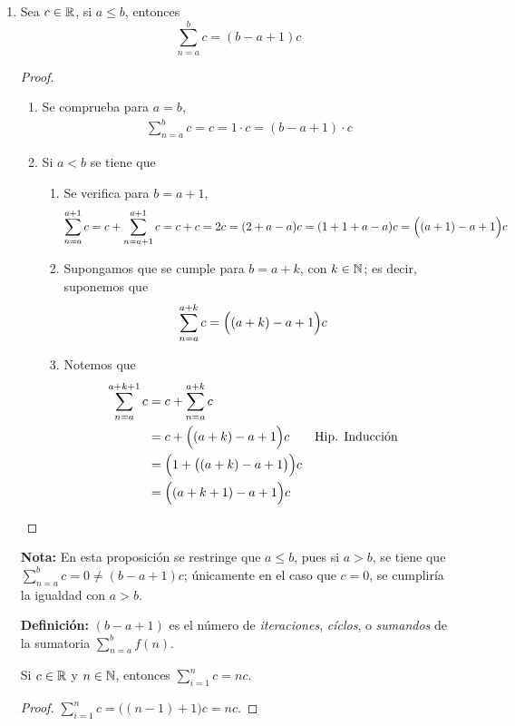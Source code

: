 \begin{enumerate}[label=\alph*)]
  \item Sea $c\in \mathbb{R}$, si $a\leq b$, entonces \[\sum_{n=a}^b c = (b-a+1)c\]
  \begin{proof}\leavevmode
    \begin{enumerate}[label=\Roman*)]
      \item Se comprueba para $a=b$, \begin{align*}
        \sum_{n=a}^b c = c = 1\cdot c = (b-a+1)\cdot c
      \end{align*}
      \item Si $a<b$ se tiene que \begin{enumerate}[label=\roman*)]
        \item Se verifica para $b=a+1$, \begin{align*}
          \sum_{n=a}^{a+1} c &= c + \sum_{n=a+1}^{a+1} c = c + c = 2c = (2+a-a)c = (1+1+a-a)c = \Bigl((a+1)-a+1\Bigr) c
        \end{align*}
        \item Supongamos que se cumple para $b=a+k$, con $k\in \mathbb{N}$; es decir, suponemos que \begin{align*}
          \sum_{n=a}^{a+k} c &= \Bigl((a+k)-a+1\Bigr) c
        \end{align*}
        \item Notemos que \begin{align*}
          \sum_{n=a}^{a+k+1} c &= c + \sum_{n=a}^{a+k} c\\
          &= c + \Bigl((a+k)-a+1\Bigr) c && \text{Hip. Inducción}\\
          &= \Bigl(1 + \bigl((a+k)-a+1\bigr) \Bigr)c\\
          &= \Bigl((a+k+1)-a+1\Bigr)c
        \end{align*}
      \end{enumerate}
    \end{enumerate}
  \end{proof}

  \textbf{Nota:} En esta proposición se restringe que $a\leq b$, pues si $a>b$, se tiene que $\sum_{n=a}^{b} c = 0 \neq (b-a+1)c$; únicamente en el caso que $c=0$, se cumpliría la igualdad con $a>b$.

  \textbf{Definición:} $(b-a+1)$ es el número de \textit{iteraciones}, \textit{cíclos}, o \textit{sumandos} de la sumatoria $\sum_{n=a}^{b} f(n)$.

   Si $c\in \mathbb{R}$ y $n\in \mathbb{N}$, entonces $\sum_{i=1}^n c = nc$.
  \begin{proof} $\sum_{i=1}^n c = \bigl((n-1)+1\bigr) c = nc$.
  \end{proof}
  

\end{enumerate}
